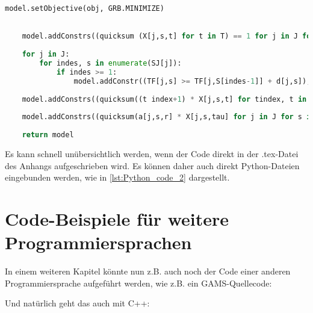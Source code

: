 \begin{appendix}
\begin{lstlisting}[language=Python, caption={Hier kann eine Überschrift eingefügt werden, die den Code beschreibt}, label={lst:Python_code}]
    model.setObjective(obj, GRB.MINIMIZE)
    

    model.addConstrs((quicksum (X[j,s,t] for t in T) == 1 for j in J for s in SJ[j]), 'Einmal')
    
    for j in J:
        for indes, s in enumerate(SJ[j]):
            if indes >= 1:
                model.addConstr((TF[j,s] >= TF[j,S[indes-1]] + d[j,s]), 'Schritte')
    
    model.addConstrs((quicksum((t index+1) * X[j,s,t] for tindex, t in enumerate(T)) == TF[j,s] for j in J for s in SJ[j]), 'Zeitpunkte')
    
    model.addConstrs((quicksum(a[j,s,r] * X[j,s,tau] for j in J for s in SJ[j] for indetau, tau in enumerate(T) if indet <= indetau <= indet + d[j,s] - 1) <= b[r,t] for r in R for indet, t in enumerate(T)), 'Ressourcen')
   
    return model
\end{lstlisting}

\newpage
Es kann schnell unübersichtlich werden, wenn der Code direkt in der .tex-Datei des Anhangs aufgeschrieben wird. Es können daher auch direkt Python-Dateien eingebunden werden, wie in \autoref{lst:Python_code_2} dargestellt.



\newpage
\section{Code-Beispiele für weitere Programmiersprachen}
In einem weiteren Kapitel könnte nun z.B. auch noch der Code einer anderen Programmiersprache aufgeführt werden, wie z.B. ein GAMS-Quellecode:



Und natürlich geht das auch mit C++:


\end{appendix}